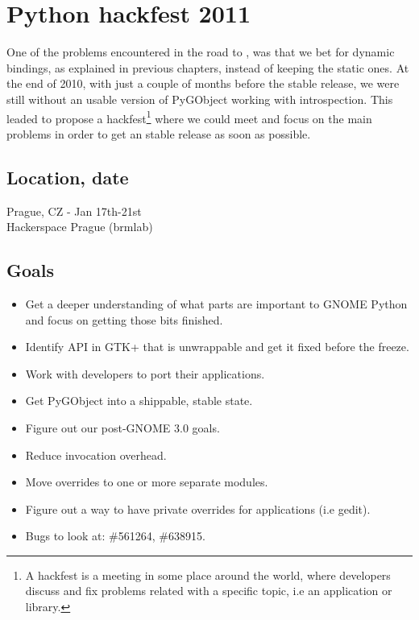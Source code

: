 
\chapter{Python hackfest 2011}

One of the problems encountered in the road to , was that we bet for dynamic bindings, as explained in previous chapters, instead of keeping the static ones. At the end of 2010, with just a couple of months before the stable release, we were still without an usable version of PyGObject working with introspection. This leaded to propose a hackfest\footnote{A hackfest is a meeting in some place around the world, where developers discuss and fix problems related with a specific topic, i.e an application or library.} where we could meet and focus on the main problems in order to get an stable release as soon as possible.

\section{Location, date}

Prague, CZ - Jan 17th-21st\\
Hackerspace Prague (brmlab)

\section{Goals}

\begin{itemize}
  \item Get a deeper understanding of what parts are important to GNOME Python and focus on getting those bits finished.
  \item Identify API in GTK+ that is unwrappable and get it fixed before the freeze.
  \item Work with developers to port their applications.
  \item Get PyGObject into a shippable, stable state.
  \item Figure out our post-GNOME 3.0 goals.
  \item Reduce invocation overhead.
  \item Move overrides to one or more separate modules.
  \item Figure out a way to have private overrides for applications (i.e gedit).
  \item Bugs to look at: \#561264, \#638915.
\end{itemize}

